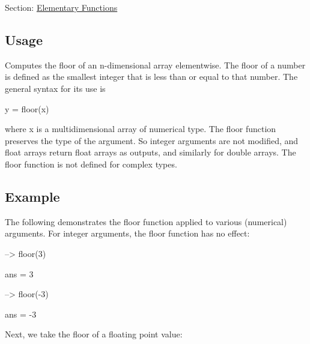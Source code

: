 Section\-: \hyperlink{sec_elementary}{Elementary Functions} \hypertarget{vtkwidgets_vtkxyplotwidget_Usage}{}\subsection{Usage}\label{vtkwidgets_vtkxyplotwidget_Usage}
Computes the floor of an n-\/dimensional array elementwise. The floor of a number is defined as the smallest integer that is less than or equal to that number. The general syntax for its use is \begin{DoxyVerb}   y = floor(x)
\end{DoxyVerb}
 where {\ttfamily x} is a multidimensional array of numerical type. The {\ttfamily floor} function preserves the type of the argument. So integer arguments are not modified, and {\ttfamily float} arrays return {\ttfamily float} arrays as outputs, and similarly for {\ttfamily double} arrays. The {\ttfamily floor} function is not defined for complex types. \hypertarget{variables_struct_Example}{}\subsection{Example}\label{variables_struct_Example}
The following demonstrates the {\ttfamily floor} function applied to various (numerical) arguments. For integer arguments, the floor function has no effect\-:


\begin{DoxyVerbInclude}
--> floor(3)

ans = 
 3 

--> floor(-3)

ans = 
 -3 
\end{DoxyVerbInclude}


Next, we take the {\ttfamily floor} of a floating point value\-:


